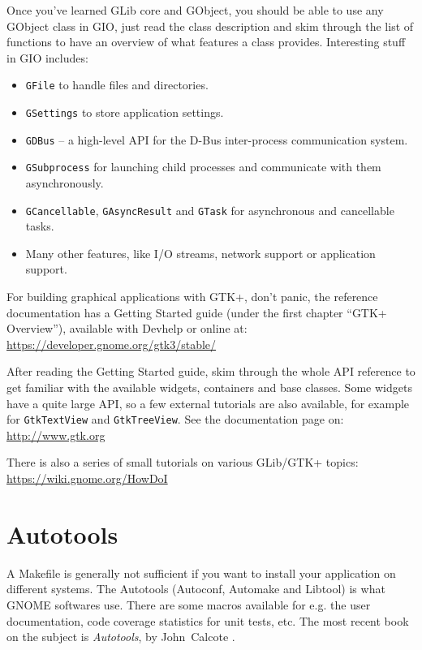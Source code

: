 Once you've learned GLib core and GObject, you should be able to use any GObject class in GIO, just read the class description and skim through the list of functions to have an overview of what features a class provides. Interesting stuff in GIO includes:
\begin{itemize}
  \item \lstinline{GFile} to handle files and directories.
  \item \lstinline{GSettings} to store application settings.
  \item \lstinline{GDBus} -- a high-level API for the D-Bus inter-process communication system.
  \item \lstinline{GSubprocess} for launching child processes and communicate with them asynchronously.
  \item \lstinline{GCancellable}, \lstinline{GAsyncResult} and \lstinline{GTask} for asynchronous and cancellable tasks.
  \item Many other features, like I/O streams, network support or application support.
\end{itemize}

For building graphical applications with GTK+, don't panic, the reference documentation has a Getting Started guide (under the first chapter ``GTK+ Overview''), available with Devhelp or online at:\\
\url{https://developer.gnome.org/gtk3/stable/}

After reading the Getting Started guide, skim through the whole API reference to get familiar with the available widgets, containers and base classes. Some widgets have a quite large API, so a few external tutorials are also available, for example for \lstinline{GtkTextView} and \lstinline{GtkTreeView}. See the documentation page on:\\
\url{http://www.gtk.org}

There is also a series of small tutorials on various GLib/GTK+ topics:\\
\url{https://wiki.gnome.org/HowDoI}

\section{Autotools}

A Makefile is generally not sufficient if you want to install your application on different systems. The Autotools (Autoconf, Automake and Libtool) is what GNOME softwares use. There are some macros available for e.g. the user documentation, code coverage statistics for unit tests, etc. The most recent book on the subject is \emph{Autotools}, by John~Calcote \cite{autotools}.

